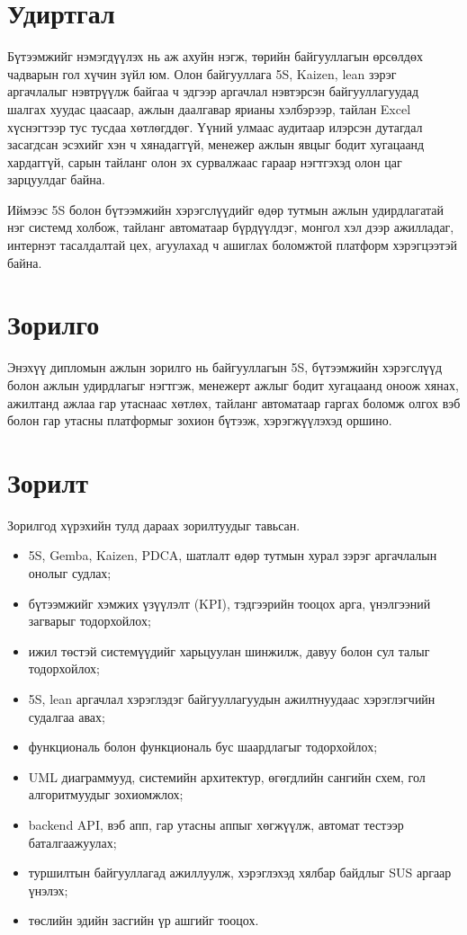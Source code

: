 
{}
\section*{Удиртгал}
Бүтээмжийг нэмэгдүүлэх нь аж ахуйн нэгж, төрийн байгууллагын өрсөлдөх чадварын гол хүчин зүйл юм. Олон байгууллага 5S, Kaizen, lean зэрэг аргачлалыг нэвтрүүлж байгаа ч эдгээр аргачлал нэвтэрсэн байгууллагуудад шалгах хуудас цаасаар, ажлын даалгавар ярианы хэлбэрээр, тайлан Excel хүснэгтээр тус тусдаа хөтлөгддөг. Үүний улмаас аудитаар илэрсэн дутагдал засагдсан эсэхийг хэн ч хянадаггүй, менежер ажлын явцыг бодит хугацаанд хардаггүй, сарын тайланг олон эх сурвалжаас гараар нэгтгэхэд олон цаг зарцуулдаг байна.

Иймээс 5S болон бүтээмжийн хэрэгслүүдийг өдөр тутмын ажлын удирдлагатай нэг системд холбож, тайланг автоматаар бүрдүүлдэг, монгол хэл дээр ажилладаг, интернэт тасалдалтай цех, агуулахад ч ашиглах боломжтой платформ хэрэгцээтэй байна.

\section*{Зорилго}
Энэхүү дипломын ажлын зорилго нь байгууллагын 5S, бүтээмжийн хэрэгслүүд болон ажлын удирдлагыг нэгтгэж, менежерт ажлыг бодит хугацаанд оноож хянах, ажилтанд ажлаа гар утаснаас хөтлөх, тайланг автоматаар гаргах боломж олгох вэб болон гар утасны платформыг зохион бүтээж, хэрэгжүүлэхэд оршино.

\section*{Зорилт}
Зорилгод хүрэхийн тулд дараах зорилтуудыг тавьсан.
\begin{itemize}
    \item 5S, Gemba, Kaizen, PDCA, шатлалт өдөр тутмын хурал зэрэг аргачлалын онолыг судлах;
    \item бүтээмжийг хэмжих үзүүлэлт (KPI), тэдгээрийн тооцох арга, үнэлгээний загварыг тодорхойлох;
    \item ижил төстэй системүүдийг харьцуулан шинжилж, давуу болон сул талыг тодорхойлох;
    \item 5S, lean аргачлал хэрэглэдэг байгууллагуудын ажилтнуудаас хэрэглэгчийн судалгаа авах;
    \item функциональ болон функциональ бус шаардлагыг тодорхойлох;
    \item UML диаграммууд, системийн архитектур, өгөгдлийн сангийн схем, гол алгоритмуудыг зохиомжлох;
    \item backend API, вэб апп, гар утасны аппыг хөгжүүлж, автомат тестээр баталгаажуулах;
    \item туршилтын байгууллагад ажиллуулж, хэрэглэхэд хялбар байдлыг SUS аргаар үнэлэх;
    \item төслийн эдийн засгийн үр ашгийг тооцох.
\end{itemize}

